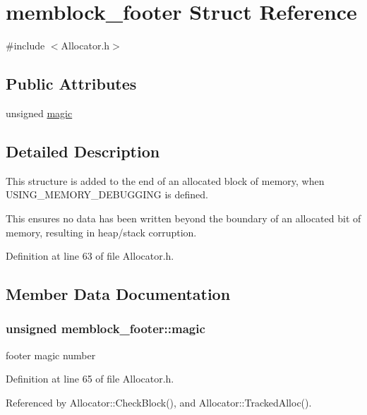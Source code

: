 \section{memblock\-\_\-footer Struct Reference}
\label{structmemblock__footer}


{\ttfamily \#include $<$Allocator.\-h$>$}

\subsection*{Public Attributes}
\begin{DoxyCompactItemize}
\item 
unsigned \hyperlink{structmemblock__footer_adbe248bf9ad8f03cdc7c202140989da9}{magic}
\end{DoxyCompactItemize}


\subsection{Detailed Description}
This structure is added to the end of an allocated block of memory, when U\-S\-I\-N\-G\-\_\-\-M\-E\-M\-O\-R\-Y\-\_\-\-D\-E\-B\-U\-G\-G\-I\-N\-G is defined.

This ensures no data has been written beyond the boundary of an allocated bit of memory, resulting in heap/stack corruption. 

Definition at line 63 of file Allocator.\-h.



\subsection{Member Data Documentation}
\subsubsection[{magic}]{\setlength{\rightskip}{0pt plus 5cm}unsigned memblock\-\_\-footer\-::magic}\label{structmemblock__footer_adbe248bf9ad8f03cdc7c202140989da9}
footer magic number 

Definition at line 65 of file Allocator.\-h.



Referenced by Allocator\-::\-Check\-Block(), and Allocator\-::\-Tracked\-Alloc().

